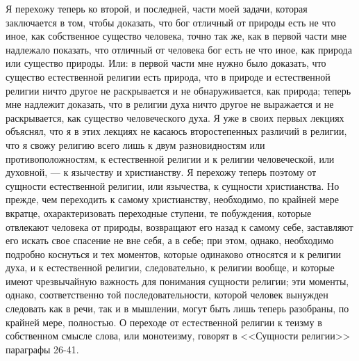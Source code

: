 \documentclass[12pt]{article}
\begin{document}
Я перехожу теперь ко второй, и последней, части моей задачи, которая заключается в том, чтобы доказать, что бог отличный от природы есть не что иное, как собственное существо человека, точно так же, как в первой части мне надлежало показать, что отличный от человека бог есть не что иное, как природа или существо природы. Или: в первой части мне нужно было доказать, что существо естественной религии есть природа, что в природе и естественной религии ничто другое не раскрывается и не обнаруживается, как природа; теперь мне надлежит доказать, что в религии духа ничто другое не выражается и не раскрывается, как существо человеческого духа. Я уже в своих первых лекциях объяснял, что я в этих лекциях не касаюсь второстепенных различий в религии, что я свожу религию всего лишь к двум разновидностям или противоположностям, к естественной религии и к религии человеческой, или духовной, --- к язычеству и христианству. Я перехожу теперь поэтому от сущности естественной религии, или язычества, к сущности христианства. Но прежде, чем переходить к самому христианству, необходимо, по крайней мере вкратце, охарактеризовать переходные ступени, те побуждения, которые отвлекают человека от природы, возвращают его назад к самому себе, заставляют его искать свое спасение не вне себя, а в себе; при этом, однако, необходимо подробно коснуться и тех моментов, которые одинаково относятся и к религии духа, и к естественной религии, следовательно, к религии вообще, и которые имеют чрезвычайную важность для понимания сущности религии; эти моменты, однако, соответственно той последовательности, которой человек вынужден следовать как в речи, так и в мышлении, могут быть лишь теперь разобраны, по крайней мере, полностью. О переходе от естественной религии к теизму в собственном смысле слова, или монотеизму, говорят в <<Сущности религии>> параграфы 26-41. 
\end{document}
